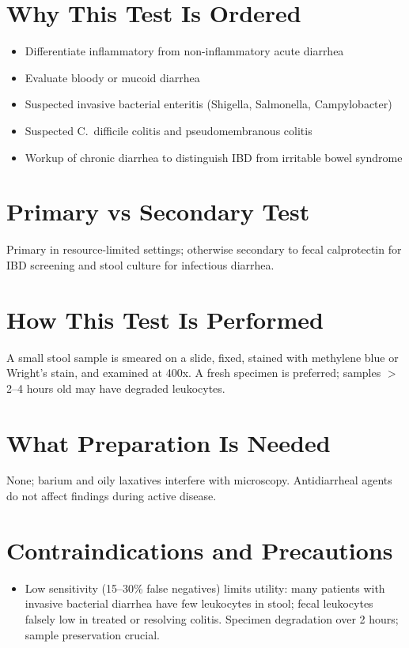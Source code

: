 \section*{Why This Test Is Ordered}
\begin{itemize}
  \item Differentiate inflammatory from non-inflammatory acute diarrhea
  \item Evaluate bloody or mucoid diarrhea
  \item Suspected invasive bacterial enteritis (Shigella, Salmonella, Campylobacter)
  \item Suspected C.\ difficile colitis and pseudomembranous colitis
  \item Workup of chronic diarrhea to distinguish IBD from irritable bowel syndrome
\end{itemize}

\section*{Primary vs Secondary Test}
Primary in resource-limited settings; otherwise secondary to fecal calprotectin for IBD screening and stool culture for infectious diarrhea.

\section*{How This Test Is Performed}
A small stool sample is smeared on a slide, fixed, stained with methylene blue or Wright's stain, and examined at 400x. A fresh specimen is preferred; samples $>$ 2--4 hours old may have degraded leukocytes.

\section*{What Preparation Is Needed}
None; barium and oily laxatives interfere with microscopy. Antidiarrheal agents do not affect findings during active disease.

\section*{Contraindications and Precautions}
\begin{itemize}
  \item Low sensitivity (15--30\% false negatives) limits utility: many patients with invasive bacterial diarrhea have few leukocytes in stool; fecal leukocytes falsely low in treated or resolving colitis. Specimen degradation over 2 hours; sample preservation crucial.
\end{itemize}
